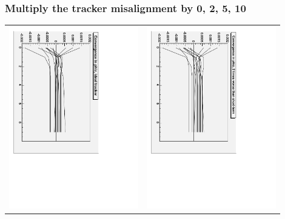 \documentclass[compress]{beamer}
\begin{document}
\begin{frame}
\frametitle{Multiply the tracker misalignment by 0, 2, 5, 10}
\begin{center}
\begin{tabular}{p{0.45\linewidth} p{0.45\linewidth}}
\includegraphics[height=\linewidth, angle=90]{phiz_conv_ideal_tracker.pdf} &
\includegraphics[height=\linewidth, angle=90]{phiz_conv_times2.pdf} \\

\end{tabular}
\end{center}
\end{frame}
\end{document}

